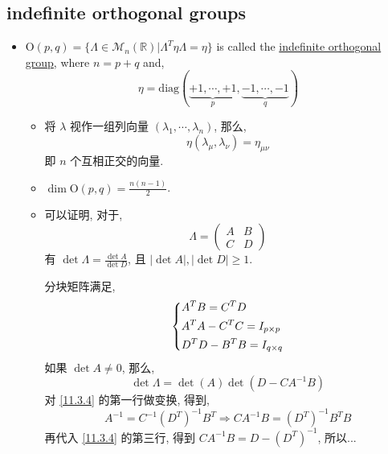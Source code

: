 \subsection{indefinite orthogonal groups}
\begin{itemize}
	\item $\mathrm{O}(p, q) = \{\Lambda \in \mathcal{M}_n(\mathbb{R}) | \Lambda^T \eta \Lambda = \eta\}$ is called the \href{https://en.wikipedia.org/wiki/Indefinite_orthogonal_group}{indefinite orthogonal group}, where $n = p + q$ and,
	\begin{equation}
		\eta = \mathrm{diag}(\underbrace{+ 1, \cdots, + 1}_{p}, \underbrace{- 1, \cdots, - 1}_{q})
	\end{equation}
	\begin{itemize}
		\item 将 $\lambda$ 视作一组列向量 $(\lambda_1, \cdots, \lambda_n)$, 那么,
		\begin{equation}
			\eta(\lambda_\mu, \lambda_\nu) = \eta_{\mu \nu}
		\end{equation}
		即 $n$ 个互相正交的向量.
		
		\item $\dim \mathrm{O}(p, q) = \frac{n (n - 1)}{2}$.
		
		\item 可以证明, 对于,
		\begin{equation}
			\Lambda = \begin{pmatrix}
				A & B \\
				C & D
			\end{pmatrix}
		\end{equation}
		有 $\det \Lambda = \frac{\det A}{\det D}$, 且 $|\det A|, |\det D| \geq 1$.
		
		\begin{tcolorbox}[title=proof:]
			分块矩阵满足,
			\begin{equation} \label{11.3.4}
				\begin{dcases}
					A^T B = C^T D \\
					A^T A - C^T C = I_{p \times p} \\
					D^T D - B^T B = I_{q \times q}
				\end{dcases}
			\end{equation}
			如果 $\det A \neq 0$, 那么,
			\begin{equation}
				\det \Lambda = \det(A) \det(D - C A^{- 1} B)
			\end{equation}
			对 \eqref{11.3.4} 的第一行做变换, 得到,
			\begin{equation}
				A^{- 1} = C^{- 1} (D^T)^{- 1} B^T \Longrightarrow C A^{- 1} B = (D^T)^{- 1} B^T B
			\end{equation}
			再代入 \eqref{11.3.4} 的第三行, 得到 $C A^{- 1} B = D - (D^T)^{- 1}$, 所以...
			

\end{tcolorbox}
\end{itemize}
\end{itemize}
